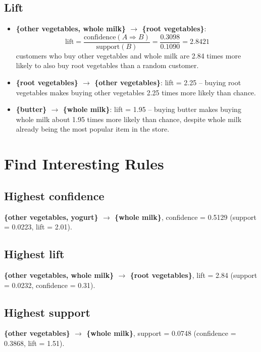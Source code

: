 \documentclass[12pt,a4paper]{article}
\begin{document}
\subsection{Lift}
\begin{itemize}[leftmargin=1.2em]
  \item \textbf{\{other vegetables, whole milk\} $\rightarrow$ \{root vegetables\}}:
  \[
  \text{lift} = \frac{\text{confidence}(A \Rightarrow B)}{\text{support}(B)}
  = \frac{0.3098}{0.1090} = 2.8421
  \]
  customers who buy other vegetables and whole milk are 2.84 times more likely to
  also buy root vegetables than a random customer.
  \item \textbf{\{root vegetables\} $\rightarrow$ \{other vegetables\}}: lift = 2.25 --
  buying root vegetables makes buying other vegetables 2.25 times more likely than chance.
  \item \textbf{\{butter\} $\rightarrow$ \{whole milk\}}: lift = 1.95 -- buying butter
  makes buying whole milk about 1.95 times more likely than chance, despite whole milk
  already being the most popular item in the store.
\end{itemize}

\clearpage
\section{Find Interesting Rules}

\subsection{Highest confidence}
\textbf{\{other vegetables, yogurt\} $\rightarrow$ \{whole milk\}}, confidence = 0.5129
(support = 0.0223, lift = 2.01).

\subsection{Highest lift}
\textbf{\{other vegetables, whole milk\} $\rightarrow$ \{root vegetables\}}, lift = 2.84
(support = 0.0232, confidence = 0.31).

\subsection{Highest support}
\textbf{\{other vegetables\} $\rightarrow$ \{whole milk\}}, support = 0.0748
(confidence = 0.3868, lift = 1.51).
\end{document}
